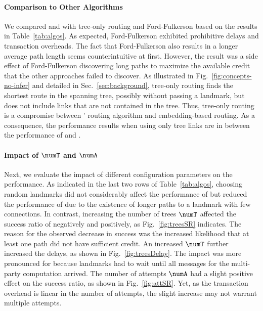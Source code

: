  

\paragraph*{Comparison to Other Algorithms} We compared \cnsysname and \oursys with tree-only routing and Ford-Fulkerson based on the results in Table~\ref{tab:algos}.
As expected, Ford-Fulkerson exhibited prohibitive delays and transaction overheads. The fact that Ford-Fulkerson also results in a longer average path length seems counterintuitive at first. However, the result was a side effect of Ford-Fulkerson discovering long paths to maximize the available credit that the other approaches failed to discover. 
As illustrated in Fig.~\ref{fig:concepts-no-infer} and detailed in Sec.~\ref{sec:background}, tree-only routing finds the shortest route in the spanning tree,
possibly without passing a landmark, but does not include links that are not contained in the tree.
Thus, tree-only routing is a compromise between \cnsysname' routing algorithm and embedding-based routing. 
As a consequence, the performance results when using only tree links are in between the performance of \cnsysname and \oursys .

\paragraph*{Impact of $\numT$ and $\numA$} Next, we evaluate the impact of different configuration parameters on the performance. 
As indicated in the last two rows of Table~\ref{tab:algos}, choosing random landmarks did not considerably affect the performance of \oursys but reduced the performance of \cnsysname due to the existence of longer paths to a landmark with few connections. 
In contrast, increasing the number of trees $\numT$ affected the success ratio of \oursys negatively and \cnsysname positively, as Fig.~\ref{fig:treesSR} indicates. 
The reason for the observed decrease in success was the increased likelihood that at least one path did not have sufficient credit. 
An increased $\numT$ further increased the delays, as shown in Fig.~\ref{fig:treesDelay}. The impact was more pronounced for \cnsysname because landmarks had to wait until all messages for the multi-party computation arrived.   
The number of attempts $\numA$ had a slight positive effect on the success ratio, as shown in Fig.~\ref{fig:attSR}. Yet, as the transaction overhead is linear in the number of attempts, the slight increase may not warrant multiple attempts.  

